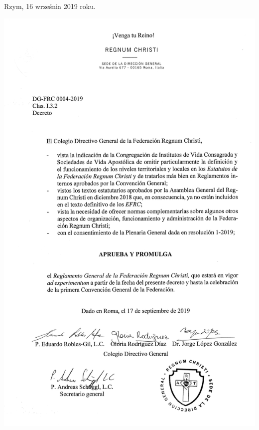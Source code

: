 Rzym, 16 września 2019 roku.

\clearpage

\begin{center}
	\includegraphics[height=
	\textheight]{dekret-przepisy-ogolne} 
\end{center}
